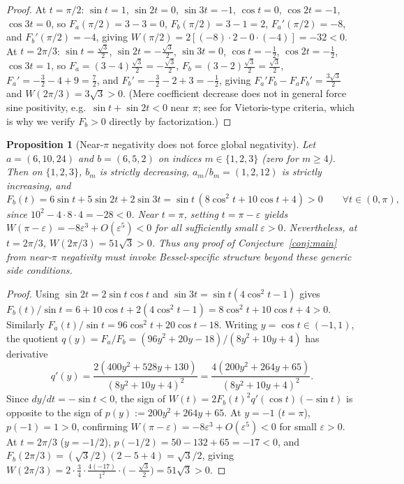 \documentclass[11pt]{article}
\newtheorem{proposition}[theorem]{Proposition}
\theoremstyle{remark}
\begin{document}
\begin{proof}
At $t = \pi/2$: $\sin t = 1$, $\sin 2t = 0$, $\sin 3t = -1$, $\cos t = 0$, $\cos 2t = -1$,
$\cos 3t = 0$, so $F_a(\pi/2) = 3 - 3 = 0$, $F_b(\pi/2) = 3 - 1 = 2$,
$F_a'(\pi/2) = -8$, and $F_b'(\pi/2) = -4$, giving
$W(\pi/2) = 2[(-8)\cdot 2 - 0\cdot(-4)] = -32 < 0$.
At $t = 2\pi/3$: $\sin t = \tfrac{\sqrt{3}}{2}$, $\sin 2t = -\tfrac{\sqrt{3}}{2}$,
$\sin 3t = 0$, $\cos t = -\tfrac{1}{2}$, $\cos 2t = -\tfrac{1}{2}$, $\cos 3t = 1$, so
$F_a = (3-4)\tfrac{\sqrt{3}}{2} = -\tfrac{\sqrt{3}}{2}$,
$F_b = (3-2)\tfrac{\sqrt{3}}{2} = \tfrac{\sqrt{3}}{2}$,
$F_a' = -\tfrac{3}{2} - 4 + 9 = \tfrac{7}{2}$, and
$F_b' = -\tfrac{3}{2} - 2 + 3 = -\tfrac{1}{2}$, giving
$F_a' F_b - F_a F_b' = \tfrac{3\sqrt{3}}{2}$ and $W(2\pi/3) = 3\sqrt{3} > 0$.
(Mere coefficient decrease does not in general force sine positivity, e.g.\
$\sin t + \sin 2t < 0$ near $\pi$; see \cite{AskeySteinig} for Vietoris-type criteria,
which is why we verify $F_b > 0$ directly by factorization.)
\end{proof}

\begin{proposition}[Near-$\pi$ negativity does not force global negativity]
\label{prop:local-global}
Let $a = (6, 10, 24)$ and $b = (6, 5, 2)$ on indices $m \in \{1,2,3\}$ (zero for $m \ge 4$).
Then on $\{1,2,3\}$, $b_m$ is strictly decreasing, $a_m/b_m = (1, 2, 12)$ is strictly
increasing, and
\[
F_b(t) = 6\sin t + 5\sin 2t + 2\sin 3t
= \sin t\,(8\cos^2 t + 10\cos t + 4) > 0 \qquad \forall t \in (0,\pi),
\]
since $10^2 - 4\cdot 8\cdot 4 = -28 < 0$. Near $t = \pi$, setting $t = \pi - \varepsilon$
yields $W(\pi - \varepsilon) = -8\varepsilon^3 + O(\varepsilon^5) < 0$ for all
sufficiently small $\varepsilon > 0$. Nevertheless, at $t = 2\pi/3$,
$W(2\pi/3) = 51\sqrt{3} > 0$. Thus any proof of Conjecture~\ref{conj:main} from near-$\pi$
negativity must invoke Bessel-specific structure beyond these generic side conditions.
\end{proposition}

\begin{proof}
Using $\sin 2t = 2\sin t\cos t$ and $\sin 3t = \sin t(4\cos^2 t - 1)$ gives
$F_b(t)/\sin t = 6 + 10\cos t + 2(4\cos^2 t - 1) = 8\cos^2 t + 10\cos t + 4 > 0$.
Similarly $F_a(t)/\sin t = 96\cos^2 t + 20\cos t - 18$. Writing $y = \cos t \in (-1,1)$,
the quotient $q(y) = F_a/F_b = (96y^2 + 20y - 18)/(8y^2 + 10y + 4)$ has derivative
\[
q'(y) = \frac{2(400 y^2 + 528 y + 130)}{(8y^2 + 10y + 4)^2}
= \frac{4(200 y^2 + 264 y + 65)}{(8y^2 + 10y + 4)^2}.
\]
Since $dy/dt = -\sin t < 0$, the sign of $W(t) = 2 F_b(t)^2 q'(\cos t)(-\sin t)$ is
opposite to the sign of $p(y) := 200 y^2 + 264 y + 65$. At $y = -1$ ($t = \pi$),
$p(-1) = 1 > 0$, confirming $W(\pi-\varepsilon) = -8\varepsilon^3 + O(\varepsilon^5) < 0$
for small $\varepsilon > 0$. At $t = 2\pi/3$ ($y = -1/2$), $p(-1/2) = 50 - 132 + 65 = -17 < 0$,
and $F_b(2\pi/3) = (\sqrt{3}/2)(2-5+4) = \sqrt{3}/2$, giving
$W(2\pi/3) = 2\cdot\frac{3}{4}\cdot\frac{4(-17)}{1^2}\cdot\bigl(-\frac{\sqrt{3}}{2}\bigr)
= 51\sqrt{3} > 0$.
\end{proof}
\end{document}
